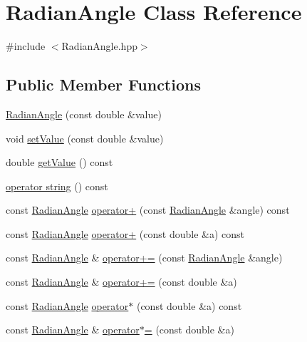 \hypertarget{class_radian_angle}{}\section{Radian\+Angle Class Reference}
\label{class_radian_angle}


{\ttfamily \#include $<$Radian\+Angle.\+hpp$>$}

\subsection*{Public Member Functions}
\begin{DoxyCompactItemize}
\item 
\hyperlink{class_radian_angle_afbe1e0f9fa6ac4d7ca513c6d7a7cafab}{Radian\+Angle} (const double \&value)
\item 
void \hyperlink{class_radian_angle_a87dae7c0daf8b7d463f478cdf72e9e9c}{set\+Value} (const double \&value)
\item 
double \hyperlink{class_radian_angle_af1bf21127c667a74076eab163613e978}{get\+Value} () const
\item 
\hyperlink{class_radian_angle_a19ff772a77d9c531b284894593a3bad3}{operator string} () const
\item 
const \hyperlink{class_radian_angle}{Radian\+Angle} \hyperlink{class_radian_angle_a3f085b5cf1b492301508a66c3a7120cf}{operator+} (const \hyperlink{class_radian_angle}{Radian\+Angle} \&angle) const
\item 
const \hyperlink{class_radian_angle}{Radian\+Angle} \hyperlink{class_radian_angle_a6e3171ec1d131de996d296fbc0a3e21e}{operator+} (const double \&a) const
\item 
const \hyperlink{class_radian_angle}{Radian\+Angle} \& \hyperlink{class_radian_angle_a0a6a7355c027adf1ee9b2d8de6199c2b}{operator+=} (const \hyperlink{class_radian_angle}{Radian\+Angle} \&angle)
\item 
const \hyperlink{class_radian_angle}{Radian\+Angle} \& \hyperlink{class_radian_angle_a0d4bed84f13d83111f64e7c3ea839626}{operator+=} (const double \&a)
\item 
const \hyperlink{class_radian_angle}{Radian\+Angle} \hyperlink{class_radian_angle_a62d344adfdbf562b51e0c1e9ead1cde5}{operator$\ast$} (const double \&a) const
\item 
const \hyperlink{class_radian_angle}{Radian\+Angle} \& \hyperlink{class_radian_angle_a19d1c6cb6594379533cf993b70326437}{operator$\ast$=} (const double \&a)
\item 

\end{DoxyCompactItemize}
